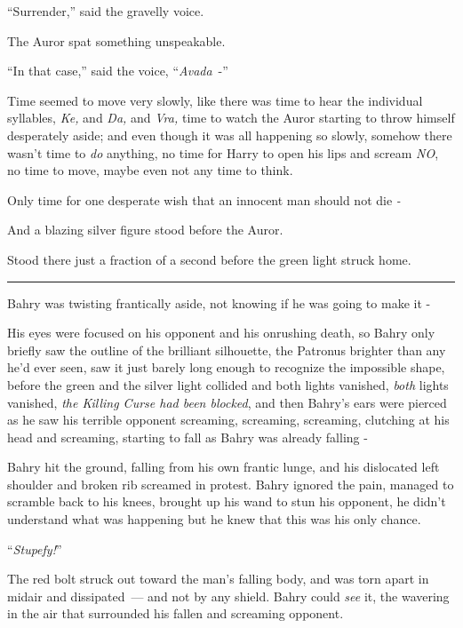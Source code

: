 ``Surrender,'' said the gravelly voice.

The Auror spat something unspeakable.

``In that case,'' said the voice, ``\emph{Avada}~-''

Time seemed to move very slowly, like there was time to hear the individual syllables, \emph{Ke,} and \emph{Da,} and \emph{Vra,} time to watch the Auror starting to throw himself desperately aside; and even though it was all happening so slowly, somehow there wasn't time to \emph{do} anything, no time for Harry to open his lips and scream \emph{NO}, no time to move, maybe even not any time to think.

Only time for one desperate wish that an innocent man should not die \emph{-}

And a blazing silver figure stood before the Auror.

Stood there just a fraction of a second before the green light struck home.

\begin{center}\rule{3in}{0.4pt}\end{center}

Bahry was twisting frantically aside, not knowing if he was going to make it -

His eyes were focused on his opponent and his onrushing death, so Bahry only briefly saw the outline of the brilliant silhouette, the Patronus brighter than any he'd ever seen, saw it just barely long enough to recognize the impossible shape, before the green and the silver light collided and both lights vanished, \emph{both} lights vanished, \emph{the Killing Curse had been blocked}, and then Bahry's ears were pierced as he saw his terrible opponent screaming, screaming, screaming, clutching at his head and screaming, starting to fall as Bahry was already falling -

Bahry hit the ground, falling from his own frantic lunge, and his dislocated left shoulder and broken rib screamed in protest. Bahry ignored the pain, managed to scramble back to his knees, brought up his wand to stun his opponent, he didn't understand what was happening but he knew that this was his only chance.

``\emph{Stupefy!}''

The red bolt struck out toward the man's falling body, and was torn apart in midair and dissipated~--- and not by any shield. Bahry could \emph{see} it, the wavering in the air that surrounded his fallen and screaming opponent.

